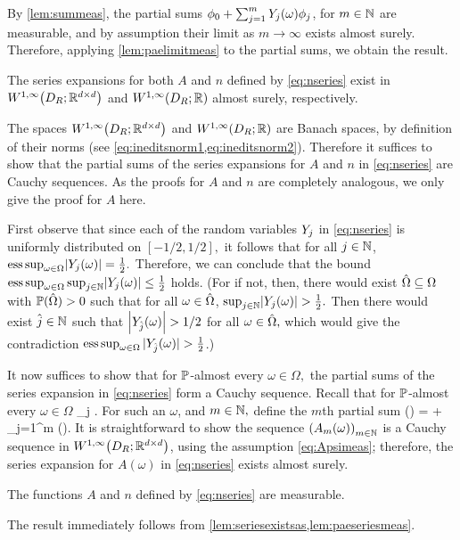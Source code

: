 By \cref{lem:summeas}, the partial sums $\phi_0 + \sum_{j=1}^m Y_{j}(\omega)\phi_j$, for $m \in \mathbb N$ are measurable, and by assumption their limit as $m \rightarrow \infty$ exists almost surely. Therefore, applying \cref{lem:paelimitmeas} to the partial sums, we obtain the result.
\epf

\ble\label{lem:seriesexistsas}
The series expansions for both $A$ and $n$ defined by \eqref{eq:nseries} exist in $\WoiDRRRdtd$ and $\WoiDRRR$ almost surely, respectively.
\ele

The spaces $\WoiDRRRdtd$ and $\WoiDRRR$ are Banach spaces, by definition of their norms (see \cref{eq:ineditsnorm1,eq:ineditsnorm2}). Therefore it suffices to show that the partial sums of the series expansions for $A$ and $n$ in \eqref{eq:nseries} are Cauchy sequences. As the proofs for $A$ and $n$ are completely analogous, we only give the proof for $A$ here.

First observe that since each of the random variables $Y_{j}$ in \eqref{eq:nseries} is uniformly distributed on $[-1/2,1/2],$ it follows that for all $j \in \mathbb N$, $\esssup_{\omega \in \Omega} \abs{\Yj(\omega)} = \frac12.$
Therefore, we can conclude that the bound $\esssup_{\omega \in \Omega} \sup_{j \in \NN} \abs{\Yj(\omega)} \leq \half$ holds.
(For if not, then, there would exist $\hat{\Omega} \subseteq \Omega$ with $\mathbb P(\hat{\Omega}) > 0$ such that for all $\omega \in \hat{\Omega}$, $\sup_{j \in \NN} \abs{\Yj(\omega)} > \half.$
Then there would exist $\hat{j} \in \mathbb N$ such that $\abs{\Yjhat(\omega)} > 1/2$ for all $\omega \in \hat{\Omega},$ which would give the contradiction $\operatorname{ess\,sup}_{\omega \in \Omega} |Y_{\hat{j}}(\omega)| > \frac{1}{2}$.)

It now suffices to show that for $\mathbb P$-almost every $\omega \in \Omega,$ the partial sums of the series expansion in \eqref{eq:nseries} form a Cauchy sequence. Recall that for $\mathbb P$-almost every $\omega \in \Omega$
\beqs
\sup_{j \in \NN} \abs{\Yj(\omega)} \leq \half.
\eeqs
For such an $\omega$, and $m \in \mathbb N,$ define the $m$th partial sum
\beqs
\Am(\omega) = \Az + \sum_{j=1}^m \Yj(\omega)\Psij.
\eeqs
It is straightforward to show the sequence $\mleft(\Am(\omega)\mright)_{m \in \NN}$ is a Cauchy sequence in $\WoiDRRRdtd$, using the assumption \eqref{eq:Apsimeas}; therefore, the series expansion for $A(\omega)$ in \eqref{eq:nseries} exists almost surely.
\epf

\ble\label{lem:seriesmeas}
The functions $A$ and $n$ defined by \eqref{eq:nseries} are measurable.
\ele

The result immediately follows from \cref{lem:seriesexistsas,lem:paeseriesmeas}.
\epf
